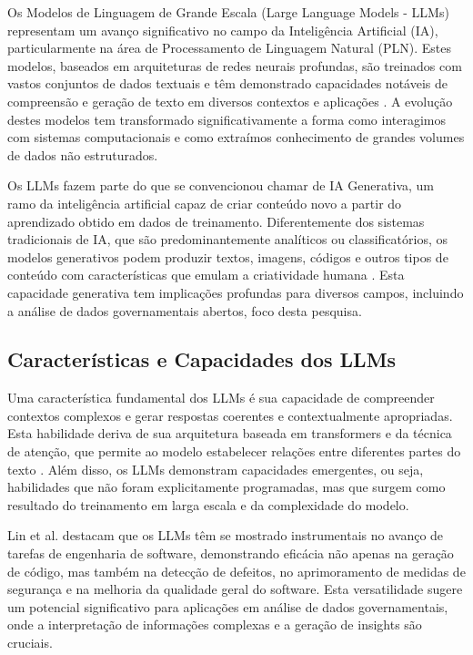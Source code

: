 Os Modelos de Linguagem de Grande Escala (Large Language Models - LLMs) representam um avanço significativo no campo da Inteligência Artificial (IA), particularmente na área de Processamento de Linguagem Natural (PLN). Estes modelos, baseados em arquiteturas de redes neurais profundas, são treinados com vastos conjuntos de dados textuais e têm demonstrado capacidades notáveis de compreensão e geração de texto em diversos contextos e aplicações \cite{Lin2024}. A evolução destes modelos tem transformado significativamente a forma como interagimos com sistemas computacionais e como extraímos conhecimento de grandes volumes de dados não estruturados.

Os LLMs fazem parte do que se convencionou chamar de IA Generativa, um ramo da inteligência artificial capaz de criar conteúdo novo a partir do aprendizado obtido em dados de treinamento. Diferentemente dos sistemas tradicionais de IA, que são predominantemente analíticos ou classificatórios, os modelos generativos podem produzir textos, imagens, códigos e outros tipos de conteúdo com características que emulam a criatividade humana \cite{Zhao2024_04}. Esta capacidade generativa tem implicações profundas para diversos campos, incluindo a análise de dados governamentais abertos, foco desta pesquisa.

\subsection{Características e Capacidades dos LLMs}

Uma característica fundamental dos LLMs é sua capacidade de compreender contextos complexos e gerar respostas coerentes e contextualmente apropriadas. Esta habilidade deriva de sua arquitetura baseada em transformers e da técnica de atenção, que permite ao modelo estabelecer relações entre diferentes partes do texto \cite{Lin2024}. Além disso, os LLMs demonstram capacidades emergentes, ou seja, habilidades que não foram explicitamente programadas, mas que surgem como resultado do treinamento em larga escala e da complexidade do modelo.

Lin et al. \cite{Lin2024} destacam que os LLMs têm se mostrado instrumentais no avanço de tarefas de engenharia de software, demonstrando eficácia não apenas na geração de código, mas também na detecção de defeitos, no aprimoramento de medidas de segurança e na melhoria da qualidade geral do software. Esta versatilidade sugere um potencial significativo para aplicações em análise de dados governamentais, onde a interpretação de informações complexas e a geração de insights são cruciais.

